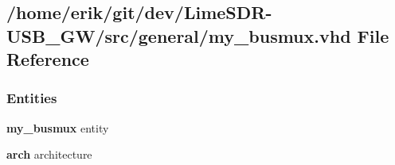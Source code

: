 \subsection{/home/erik/git/dev/\+Lime\+S\+D\+R-\/\+U\+S\+B\+\_\+\+G\+W/src/general/my\+\_\+busmux.vhd File Reference}
\label{my__busmux_8vhd}
\subsubsection*{Entities}
\begin{DoxyCompactItemize}
\item 
{\bf my\+\_\+busmux} entity
\item 
{\bf arch} architecture
\end{DoxyCompactItemize}
